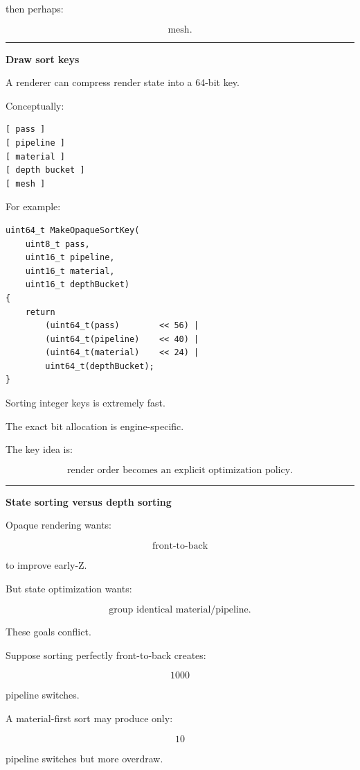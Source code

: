 then perhaps:

\[
\text{mesh}.
\]

\begin{center}\rule{0.5\linewidth}{0.5pt}\end{center}

\textbf{Draw sort keys}

A renderer can compress render state into a 64-bit key.

Conceptually:

\begin{verbatim}
[ pass ]
[ pipeline ]
[ material ]
[ depth bucket ]
[ mesh ]
\end{verbatim}

For example:

\begin{verbatim}
uint64_t MakeOpaqueSortKey(
    uint8_t pass,
    uint16_t pipeline,
    uint16_t material,
    uint16_t depthBucket)
{
    return
        (uint64_t(pass)        << 56) |
        (uint64_t(pipeline)    << 40) |
        (uint64_t(material)    << 24) |
        uint64_t(depthBucket);
}
\end{verbatim}

Sorting integer keys is extremely fast.

The exact bit allocation is engine-specific.

The key idea is:

\[
\boxed{
\text{render order becomes an explicit optimization policy}.
}
\]

\begin{center}\rule{0.5\linewidth}{0.5pt}\end{center}

\textbf{State sorting versus depth sorting}

Opaque rendering wants:

\[
\text{front-to-back}
\]

to improve early-Z.

But state optimization wants:

\[
\text{group identical material/pipeline}.
\]

These goals conflict.

Suppose sorting perfectly front-to-back creates:

\[
1000
\]

pipeline switches.

A material-first sort may produce only:

\[
10
\]

pipeline switches but more overdraw.

